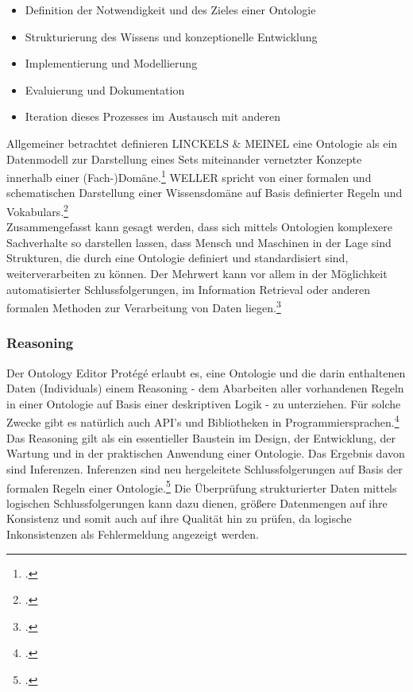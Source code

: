 \documentclass[12pt,a4paper]{article}
\begin{document}
\begin{itemize}
\item Definition der Notwendigkeit und des Zieles einer Ontologie
\item Strukturierung des Wissens und konzeptionelle Entwicklung
\item Implementierung und Modellierung
\item Evaluierung und Dokumentation
\item Iteration dieses Prozesses im Austausch mit anderen
\end{itemize}
Allgemeiner betrachtet definieren LINCKELS \& MEINEL eine Ontologie als ein Datenmodell zur Darstellung eines Sets miteinander vernetzter Konzepte innerhalb einer (Fach-)Domäne.\footcite{linckels2011librarian} WELLER spricht von einer formalen und schematischen Darstellung einer Wissensdomäne auf Basis definierter Regeln und Vokabulars.\footcite{weller2013InformationBand}
\\ 
Zusammengefasst kann gesagt werden, dass sich mittels Ontologien komplexere Sachverhalte so darstellen lassen, dass Mensch und Maschinen in der Lage sind Strukturen, die durch eine Ontologie definiert und standardisiert sind, weiterverarbeiten zu können. Der Mehrwert kann vor allem in der Möglichkeit automatisierter Schlussfolgerungen, im Information Retrieval oder anderen formalen Methoden zur Verarbeitung von Daten liegen.\footcite[][S.162-178]{jannidis2017digital} 

\subsubsection{Reasoning}

Der Ontology Editor Protégé erlaubt es, eine Ontologie und die darin enthaltenen Daten (Individuals) einem Reasoning - dem Abarbeiten aller vorhandenen Regeln in einer Ontologie auf Basis einer deskriptiven Logik - zu unterziehen. Für solche Zwecke gibt es natürlich auch API's und Bibliotheken in Programmiersprachen.\footcite{musen2015protege} Das Reasoning gilt als ein essentieller Baustein im Design, der Entwicklung, der Wartung und in der praktischen Anwendung einer Ontologie. Das Ergebnis davon sind Inferenzen. Inferenzen sind neu hergeleitete Schlussfolgerungen auf Basis der formalen Regeln einer Ontologie.\footcite{dentler2011comparison} Die Überprüfung strukturierter Daten mittels logischen Schlussfolgerungen kann dazu dienen, größere Datenmengen auf ihre Konsistenz und somit auch auf ihre Qualität hin zu prüfen, da logische Inkonsistenzen als Fehlermeldung angezeigt werden.
\end{document}
